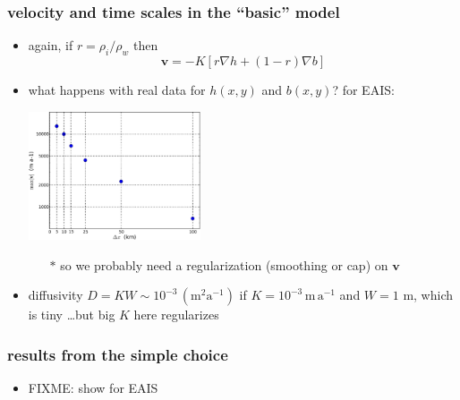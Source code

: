 \documentclass[hide notes,intlimits]{beamer}
\begin{document}
\begin{frame}
  \frametitle{velocity and time scales in the ``basic'' model}

  \begin{itemize}
    \item again, if $r = \rho_i/\rho_w$ then
      $$\mathbf{v} = - K \left[r \nabla h + (1-r) \nabla b\right]$$
    \item what happens with real data for $h(x,y)$ and $b(x,y)$? for EAIS:
    \begin{center}
    \medskip
     \qquad \includegraphics[width=0.4\textwidth]{figs/vresults}
    \medskip
    \end{center}
       \small
       \begin{itemize}
       \item[$\ast$] so we probably need a regularization (smoothing or cap) on $\mathbf{v}$
       \end{itemize}
       \normalsize
    \item diffusivity $D = K W \sim 10^{-3} \, (\text{m}^2 \text{a}^{-1})$ if $K=10^{-3} \,\text{m}\,\text{a}^{-1}$ and $W=1$ m, which is tiny \small \dots but big $K$ here regularizes
  \end{itemize}

\end{frame}


\begin{frame}
  \frametitle{results from the simple choice}

  \begin{itemize}
    \item FIXME: show for EAIS
  \end{itemize}

\end{frame}
\end{document}
